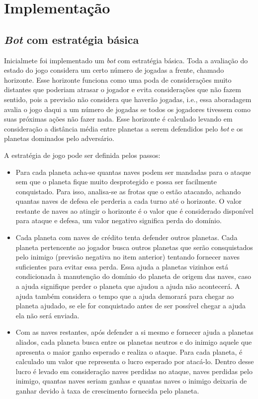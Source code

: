 \documentclass[a4paper,titlepage,11pt]{article}
\begin{document}
\section{Implementação}
\label{seq:Implementação}


\subsection{{\em Bot} com estratégia básica}
Inicialmete foi implementado um {\em bot} com estratégia básica. Toda a avaliação do estado do jogo considera um certo número de jogadas a frente, chamado horizonte. Esse horizonte funciona como uma poda de considerações muito distantes que poderiam atrasar o jogador e evita considerações que não fazem sentido, pois a previsão não considera que haverão jogadas, i.e., essa aboradagem avalia o jogo daqui a um número de jogadas se todos os jogadores tivessem como suas próximas ações não fazer nada. Esse horizonte é calculado levando em consideração a distância média entre planetas a serem defendidos pelo {\em bot} e os planetas dominados pelo adversário.

A estratégia de jogo pode ser definida pelos passos:

\begin{itemize}
\item Para cada planeta acha-se quantas naves podem ser mandadas para o ataque sem que o planeta fique muito desprotegido e possa ser facilmente conquistado. 
Para isso, analisa-se as frotas que o estão atacando, achando quantas naves de defesa ele perderia a cada turno até o horizonte. O valor restante de naves ao atingir o horizonte é o valor que é considerado disponível para ataque e defesa, um valor negativo significa perda do domínio.
\item Cada planeta com naves de crédito tenta defender outros planetas.
Cada planeta pertencente ao jogador busca outros planetas que serão consquistados pelo inimigo (previsão negativa no item anterior) tentando fornecer naves suficientes para evitar essa perda. Essa ajuda a planetas vizinhos está condicionada à manutenção do domínio do planeta de origem das naves, caso a ajuda signifique perder o planeta que ajudou a ajuda não acontecerá. A ajuda também considera o tempo que a ajuda demorará para chegar ao planeta ajudado, se ele for conquistado antes de ser possível chegar a ajuda ela não será enviada.
\item Com as naves restantes, após defender a si mesmo e fornecer ajuda a planetas aliados, cada planeta busca entre os planetas neutros e do inimigo aquele que apresenta o maior ganho esperado e realiza o ataque.
Para cada planeta, é calculado um valor que representa o lucro esperado por atacá-lo. Dentro desse lucro é levado em consideração naves perdidas no ataque, naves perdidas pelo inimigo, quantas naves seriam ganhas e quantas naves o inimigo deixaria de ganhar devido à taxa de crescimento fornecida pelo planeta.
\end{itemize}
\end{document}
